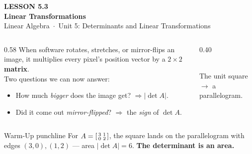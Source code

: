 \documentclass[aspectratio=169, 11pt]{beamer}
\begin{document}
{
\begin{frame}[plain]
  \vspace{2.8cm}\hspace{0.55cm}%
  \begin{minipage}{0.9\textwidth}
    {\color{goldacc}\bfseries\small LESSON 5.3}\\[0.5cm]
    {\color{white}\bfseries\LARGE Linear Transformations}\\[1.0cm]
    {\color{blushmid}\small Linear Algebra~$\cdot$~Unit 5: Determinants and Linear Transformations}
  \end{minipage}
\end{frame}
}

\begin{frame}[t, plain]
  \begin{columns}[T]
    \begin{column}{0.58\textwidth}
      When software rotates, stretches, or mirror-flips an image, it multiplies every pixel's position
      vector by a $2\times2$ \textbf{matrix}.\\[8pt]
      Two questions we can now answer:
      \begin{itemize}
        \item How much \emph{bigger} does the image get? $\Rightarrow |\det A|$.
        \item Did it come out \emph{mirror-flipped}? $\Rightarrow$ the \emph{sign} of $\det A$.
      \end{itemize}
    \end{column}
    \begin{column}{0.40\textwidth}
      \centering
      \\[4pt]
      {\scriptsize The unit square $\to$ a parallelogram.}
    \end{column}
  \end{columns}
  \vspace{2pt}
  \begin{block}{Warm-Up punchline}
    For $A=\begin{bsmallmatrix} 3 & 1\\ 0 & 2 \end{bsmallmatrix}$, the square lands on the parallelogram
    with edges $(3,0),(1,2)$ --- area $|\det A|=6$. \textbf{The determinant is an area.}
  \end{block}
\end{frame}
\end{document}
